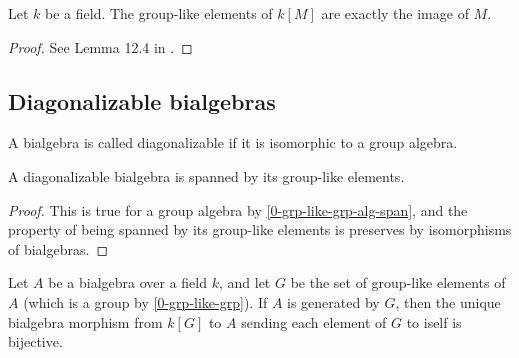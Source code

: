 \begin{lemma}
  \label{0-grp-like-grp-alg}
  \leanok

  Let $k$ be a field.
  The group-like elements of $k[M]$ are exactly the image of $M$.
\end{lemma}
\begin{proof}
  \leanok

  See Lemma 12.4 in \cite{Milne_2017}.
\end{proof}


\subsection{Diagonalizable bialgebras}

\begin{definition}
  \label{0-diag-bialg}
  \uses{}
  \leanok

  A bialgebra is called diagonalizable if it is isomorphic to a group algebra.
\end{definition}

\begin{lemma}
  \label{0-diag-bialg-group-like-span}
  \leanok 

  A diagonalizable bialgebra is spanned by its group-like elements.

\end{lemma}

\begin{proof}
  \leanok

  This is true for a group algebra by \ref{0-grp-like-grp-alg-span}, and the
  property of being spanned by its group-like elements is preserves by
  isomorphisms of bialgebras.

\end{proof}

\begin{proposition}
  \label{0-bialg-bij-of-span-group-like}
  \leanok 

  Let $A$ be a bialgebra over a field $k$, and let $G$ be the set of group-like
  elements of $A$ (which is a group by \ref{0-grp-like-grp}). If $A$ is generated 
  by $G$, then the unique bialgebra morphism from $k[G]$ to $A$ sending each
  element of $G$ to iself is bijective.

\end{proposition}

